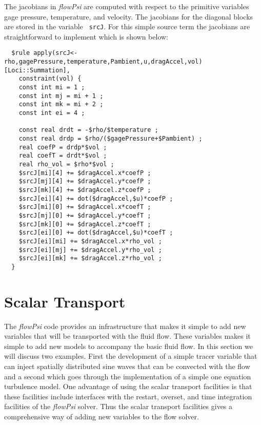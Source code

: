 \documentclass[letterpaper,twoside]{article}
\begin{document}
The jacobians in {\it flowPsi} are computed with respect to the
primitive variables gage pressure, temperature, and velocity.  The
jacobians for the diagonal blocks are stored in the variable {\tt
  srcJ}.  For this simple source term the jacobians are
straightforward to implement which is shown below:
\begin{verbatim}
  $rule apply(srcJ<-rho,gagePressure,temperature,Pambient,u,dragAccel,vol)[Loci::Summation],
    constraint(vol) {
    const int mi = 1 ;
    const int mj = mi + 1 ;
    const int mk = mi + 2 ;
    const int ei = 4 ;

    const real drdt = -$rho/$temperature ;
    const real drdp = $rho/($gagePressure+$Pambient) ;
    real coefP = drdp*$vol ;
    real coefT = drdt*$vol ;
    real rho_vol = $rho*$vol ;
    $srcJ[mi][4] += $dragAccel.x*coefP ;
    $srcJ[mj][4] += $dragAccel.y*coefP ;
    $srcJ[mk][4] += $dragAccel.z*coefP ;
    $srcJ[ei][4] += dot($dragAccel,$u)*coefP ;
    $srcJ[mi][0] += $dragAccel.x*coefT ;
    $srcJ[mj][0] += $dragAccel.y*coefT ;
    $srcJ[mk][0] += $dragAccel.z*coefT ;
    $srcJ[ei][0] += dot($dragAccel,$u)*coefT ;
    $srcJ[ei][mi] += $dragAccel.x*rho_vol ;
    $srcJ[ei][mj] += $dragAccel.y*rho_vol ;
    $srcJ[ei][mk] += $dragAccel.z*rho_vol ;
  }
\end{verbatim}
\clearpage
\section{Scalar Transport}

The {\it flowPsi} code provides an infrastructure that makes it simple to
add new variables that will be transported with the fluid flow.  These
variables makes it simple to add new models to accompany the basic
fluid flow.  In this section we will discuss two examples.  First the
development of a simple tracer variable that can inject spatially
distributed sine waves that can be convected with the flow and a
second which goes through the implementation of a simple one equation
turbulence model.  One advantage of using the scalar transport
facilities is that these facilities include interfaces with the
restart, overset, and time integration facilities of the {\it flowPsi}
solver.  Thus the scalar transport facilities gives a comprehensive way
of adding new variables to the flow solver.
\end{document}

